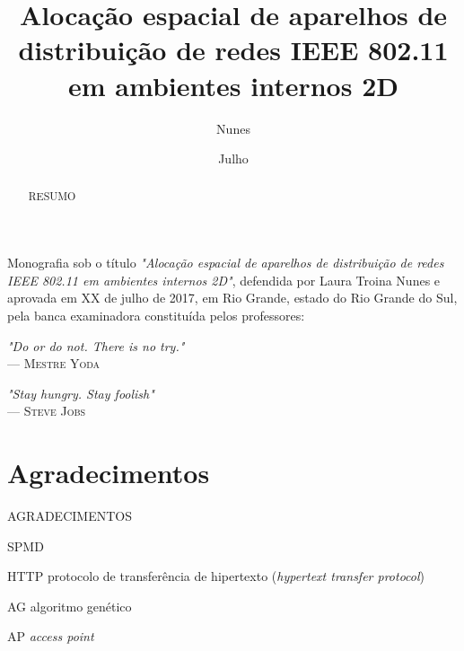 \documentclass[tc,twoside]{iiufrgs}
\title{Alocação espacial de aparelhos de distribuição de redes IEEE 802.11 em ambientes internos 2D}
\author{Nunes}{Laura Troina}
\date{Julho}{2017}
\begin{document}
 

\maketitle 

\begin{folhadeaprovacao} 
	Monografia sob o título \textit{"Alocação espacial de aparelhos de distribuição de redes IEEE 802.11 em ambientes internos 2D"}, defendida por Laura Troina Nunes e aprovada em XX de julho de 2017, em Rio Grande, estado do Rio Grande do Sul, pela banca examinadora constituída pelos professores: 
\end{folhadeaprovacao} 

\clearpage 

\begin{flushright} 
	\mbox{}\vfill 
	{\sffamily\itshape 
		"Do or do not. There is no try."\\} 
	--- \textsc{Mestre Yoda} 
\end{flushright} 
\begin{flushright} 
	\mbox{}\vfill 
	{\sffamily\itshape 
		"Stay hungry. Stay foolish"\\} 
	--- \textsc{Steve Jobs} 
\end{flushright} 
\chapter*{Agradecimentos} 

AGRADECIMENTOS

\tableofcontents 

\begin{listofabbrv}{SPMD} 
	\item[HTTP] protocolo de transferência de hipertexto (\textit{hypertext transfer protocol}) 
	\item[AG] algoritmo genético
	\item[AP] \textit{access point}
\end{listofabbrv} 

\listoffigures 

\listoftables 

\begin{abstract} 
RESUMO
\end{abstract} 
\end{document}
